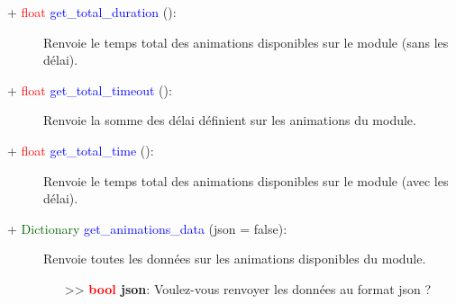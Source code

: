 \documentclass[a4paper, 11pt]{article}
\begin{document}
	\begin{description}
		\item [+ \textcolor{red}{float} \textcolor{blue}{get\_total\_duration} ():] Renvoie le temps total
		des animations disponibles sur le module (sans les délai).\\
	\end{description}
	\begin{description}
		\item [+ \textcolor{red}{float} \textcolor{blue}{get\_total\_timeout} ():] Renvoie la somme des 
		délai définient sur les animations du module.\\
	\end{description}
	\begin{description}
		\item [+ \textcolor{red}{float} \textcolor{blue}{get\_total\_time} ():] Renvoie le temps total
		des animations disponibles sur le module (avec les délai).\\
	\end{description}
	\begin{description}
		\item [+ \textcolor{darkgreen}{Dictionary} \textcolor{blue}{get\_animations\_data} (json = false):] 
		Renvoie toutes les données sur les animations disponibles du module.
		\begin{itemize}
			\item [>> \textbf{\textcolor{red}{bool} json}:] Voulez-vous renvoyer les données au format json 
			?\\
		\end{itemize}
	\end{description}

\end{document}
